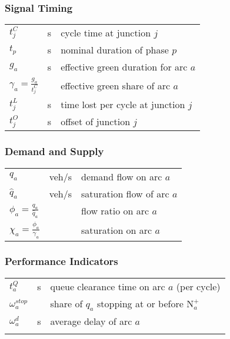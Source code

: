 \subsubsection*{Signal Timing}
\begin{tabu} to \textwidth {X[3,c] X[1,c] X[6,l]}
$ t_j^C $ & s & cycle time at junction $j$\\[2pt]
$ t_p   $ & s & nominal duration of phase $p$\\[2pt]
$ g_a   $ & s & effective green duration for arc $a$\\[3pt]
$ \displaystyle \gamma_a = \frac{g_a}{t_j^C} $ & & effective green share of arc $a$\\[2pt]
$ t_j^L $ & s & time lost per cycle at junction $j$\\[2pt]
$ t_j^O $ & s & offset of junction $j$ \\[2pt]
\end{tabu} 



\subsubsection*{Demand and Supply}
\begin{tabu} to \textwidth {X[3,c] X[1,c] X[6,l]}
$ q_{a} $ & veh/s & demand flow on arc $a$ \\[2pt]
$ \hat{q}_a $ & veh/s & saturation flow of arc $a$ \\[2pt]
$ \displaystyle \phi_a = \frac{q_a}{\hat{q}_a} $ & & flow ratio on arc $a$ \\[2pt]
$ \displaystyle \chi_a = \frac{\phi_a}{\gamma_a} $ & & saturation on arc $a$ \\[2pt]
\end{tabu} 

\subsubsection*{Performance Indicators}
\begin{tabu} to \textwidth {X[3,c] X[1,c] X[6,l]}
$ t_a^Q $ & s & queue clearance time on arc $a$ (per cycle)\\[2pt]
$ \omega_a^{stop}$ & & share of $q_a$ stopping at or before $\mathrm{N}_{a}^{+}$ \\[2pt]
$ \omega_a^d $ & s & average delay of arc $a$ \\[2pt]
$ $ & & \\[2pt]
\end{tabu}